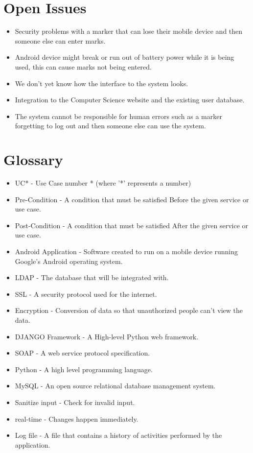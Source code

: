 \documentclass[a4paper]{article}
\begin{document}
	\section{Open Issues}
	
		\begin{itemize}
			\item Security problems with a marker that can lose their mobile device and then someone else can enter marks.
			\item Android device might break or run out of battery power while it is being used, this can cause marks not being entered.
			\item We don't yet know how the interface to the system looks.
			\item Integration to the Computer Science website and the existing user database.
			\item The system cannot be responsible for human errors such as a marker forgetting to log out and then someone else can use the system.
		\end{itemize}
	

	\section{Glossary}
		
		\begin{itemize}
			\item UC* - Use Case number * (where '*' represents a number)
			\item Pre-Condition - A condition that must be satisfied Before the given service or use case.
			\item Post-Condition - A condition that must be satisfied After the given service or use case.
			\item Android Application - Software created to run on a mobile device running Google's Android operating system.
			\item LDAP - The database that will be integrated with.
			\item SSL - A security protocol used for the internet.
			\item Encryption - Conversion of data so that unauthorized people can't view the data.
			\item DJANGO Framework - A High-level Python web framework.
			\item SOAP - A web service protocol specification.
			\item Python - A high level programming language.
			\item MySQL - An open source relational database management system.
			\item Sanitize input - Check for invalid input.
			\item real-time - Changes happen immediately.
			\item Log file - A file that contains a history of activities performed by the application.
		
		\end{itemize}
\end{document}
